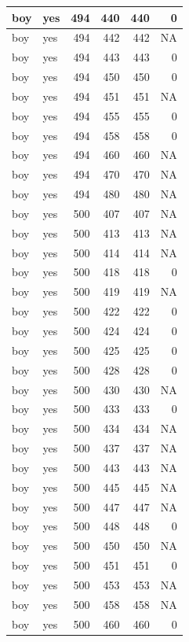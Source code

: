 \documentclass[man]{apa6}
\begin{document}
\begin{tabular}{l|l|r|r|r|r}
\hline
boy & yes & 494 & 440 & 440 & 0\\
\hline
boy & yes & 494 & 442 & 442 & NA\\
\hline
boy & yes & 494 & 443 & 443 & 0\\
\hline
boy & yes & 494 & 450 & 450 & 0\\
\hline
boy & yes & 494 & 451 & 451 & NA\\
\hline
boy & yes & 494 & 455 & 455 & 0\\
\hline
boy & yes & 494 & 458 & 458 & 0\\
\hline
boy & yes & 494 & 460 & 460 & NA\\
\hline
boy & yes & 494 & 470 & 470 & NA\\
\hline
boy & yes & 494 & 480 & 480 & NA\\
\hline
boy & yes & 500 & 407 & 407 & NA\\
\hline
boy & yes & 500 & 413 & 413 & NA\\
\hline
boy & yes & 500 & 414 & 414 & NA\\
\hline
boy & yes & 500 & 418 & 418 & 0\\
\hline
boy & yes & 500 & 419 & 419 & NA\\
\hline
boy & yes & 500 & 422 & 422 & 0\\
\hline
boy & yes & 500 & 424 & 424 & 0\\
\hline
boy & yes & 500 & 425 & 425 & 0\\
\hline
boy & yes & 500 & 428 & 428 & 0\\
\hline
boy & yes & 500 & 430 & 430 & NA\\
\hline
boy & yes & 500 & 433 & 433 & 0\\
\hline
boy & yes & 500 & 434 & 434 & NA\\
\hline
boy & yes & 500 & 437 & 437 & NA\\
\hline
boy & yes & 500 & 443 & 443 & NA\\
\hline
boy & yes & 500 & 445 & 445 & NA\\
\hline
boy & yes & 500 & 447 & 447 & NA\\
\hline
boy & yes & 500 & 448 & 448 & 0\\
\hline
boy & yes & 500 & 450 & 450 & NA\\
\hline
boy & yes & 500 & 451 & 451 & 0\\
\hline
boy & yes & 500 & 453 & 453 & NA\\
\hline
boy & yes & 500 & 458 & 458 & NA\\
\hline
boy & yes & 500 & 460 & 460 & 0\\

\end{tabular}
\end{document}
